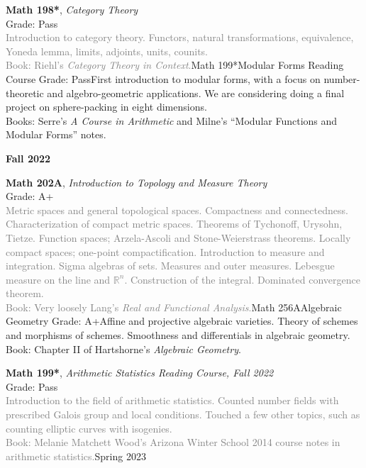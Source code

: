 \documentclass{article}
\renewcommand{\subsection}[1]{{\color{headercolor}\Large
    \textbf{#1\phantom{p}}}}
\newcommand{\entry}[5]{{\large\textbf{#1}, \textit{#2}}\\
    #3\hfill\\
    \textcolor{gray}{#4}}
\begin{document}
\entry{Math 198*}{Category Theory}
{Grade: Pass}{Introduction to category theory. Functors, natural transformations, equivalence, Yoneda lemma, limits, adjoints, units, counits. \\
Book: Riehl's \textit{Category Theory in Context}.}


\entry{Math 199*}{Modular Forms Reading Course}
{Grade: Pass}{First introduction to modular forms, with a focus on number-theoretic and algebro-geometric applications. We are considering doing a final project on sphere-packing in eight dimensions. \\
Books: Serre's \textit{A Course in Arithmetic} and Milne's ``Modular Functions and Modular Forms'' notes.}


\subsection{Fall 2022}

\entry{Math 202A}{Introduction to Topology and Measure Theory}
{Grade: A+}{Metric spaces and general topological spaces. Compactness and connectedness. Characterization of compact metric spaces. Theorems of Tychonoff, Urysohn, Tietze. Function spaces; Arzela-Ascoli and Stone-Weierstrass theorems. Locally compact spaces; one-point compactification. Introduction to measure and integration. Sigma algebras of sets. Measures and outer measures. Lebesgue measure on the line and $\mathbb R^n$. Construction of the integral. Dominated convergence theorem. \\
Book: Very loosely Lang's \textit{Real and Functional Analysis}.}


\entry{Math 256A}{Algebraic Geometry}
{Grade: A+}{Affine and projective algebraic varieties. Theory of schemes and morphisms of schemes. Smoothness and differentials in algebraic geometry. \\
Book: Chapter II of Hartshorne's \textit{Algebraic Geometry}.}


\entry{Math 199*}{Arithmetic Statistics Reading Course, Fall 2022}
{Grade: Pass}{Introduction to the field of arithmetic statistics. Counted number fields with prescribed Galois group and local conditions. Touched a few other topics, such as counting elliptic curves with isogenies. \\
Book: Melanie Matchett Wood's Arizona Winter School 2014 course notes in arithmetic statistics.}


\subsection{Spring 2023}
\end{document}
